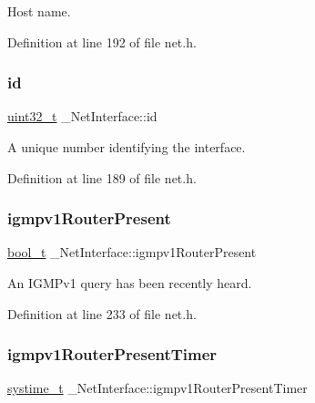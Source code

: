 Host name. 



Definition at line 192 of file net.\+h.

\mbox{\label{struct__NetInterface_aece6aed08d5e6b93f3df55bb2f7374f7}} 
\subsubsection{\texorpdfstring{id}{id}}
{\footnotesize\ttfamily \hyperlink{stdint_8h_a435d1572bf3f880d55459d9805097f62}{uint32\+\_\+t} \+\_\+\+Net\+Interface\+::id}



A unique number identifying the interface. 



Definition at line 189 of file net.\+h.

\mbox{\label{struct__NetInterface_a32275d3c857019288295ba717c08178e}} 
\subsubsection{\texorpdfstring{igmpv1\+Router\+Present}{igmpv1RouterPresent}}
{\footnotesize\ttfamily \hyperlink{compiler__port_8h_a812d16e5494522586b3784e55d479912}{bool\+\_\+t} \+\_\+\+Net\+Interface\+::igmpv1\+Router\+Present}



An I\+G\+M\+Pv1 query has been recently heard. 



Definition at line 233 of file net.\+h.

\mbox{\label{struct__NetInterface_a1cbd92637a504270813b879f299bda40}} 
\subsubsection{\texorpdfstring{igmpv1\+Router\+Present\+Timer}{igmpv1RouterPresentTimer}}
{\footnotesize\ttfamily \hyperlink{compiler__port_8h_ae3e32a98d431a02106616da3071832dd}{systime\+\_\+t} \+\_\+\+Net\+Interface\+::igmpv1\+Router\+Present\+Timer}



